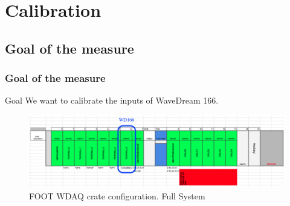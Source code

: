 \section{Calibration}
\subsection{Goal of the measure}
\begin{frame} [fragile]
\small
	\frametitle{Goal of the measure}
	\begin{block}{Goal}
		We want to calibrate the inputs of WaveDream 166.
		 
	\end{block}
	
    	\begin{figure}
	\centering
		\includegraphics[scale=0.3]{figures/crate_configuration/wd166.png}
		
		\caption{FOOT WDAQ crate configuration. Full System}
	\end{figure}  
	
\end{frame}